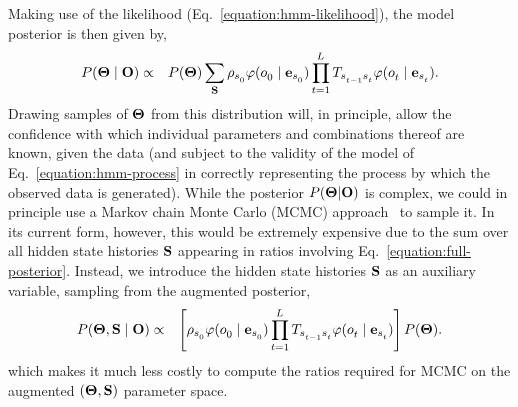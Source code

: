 \documentclass[aps,pre,twocolumn,superscriptaddress,nofootinbib,longbibliography]{revtex4-1}
\newcommand{\bfm}[1]{{\bf #1}}
\begin{document}
{Making use of the likelihood (Eq.~\ref{equation:hmm-likelihood}), the model posterior is then given by,
\begin{eqnarray}
P(\bfm{\Theta} \mid \bfm{O}) &\propto& P(\bfm{\Theta}) \sum_{\bfm{S}}\rho_{s^{}_{0}} \varphi(o^{}_{0} \mid \bfm{e}_{s^{}_{0}}) \prod_{t=1}^{L^{}} T_{s^{}_{t-1} s^{}_{t}} \varphi(o^{}_{t} \mid \bfm{e}_{s^{}_{t}})  \label{equation:full-posterior} .
\end{eqnarray}
Drawing samples of $\bfm{\Theta}$ from this distribution will, in principle, allow the confidence with which individual parameters and combinations thereof are known, given the data (and subject to the validity of the model of Eq.~\ref{equation:hmm-process} in correctly representing the process by which the observed data is generated).
While the posterior $P(\bfm{\Theta}|\bfm{O})$ is complex, we could in principle use a Markov chain Monte Carlo (MCMC) approach~\cite{jun-s-liu:mcmc} to sample it.
In its current form, however, this would be extremely expensive due to the sum over all hidden state histories $\bfm{S}$ appearing in ratios involving Eq.~\ref{equation:full-posterior}.
Instead, we introduce the hidden state histories $\bfm{S}$ as an auxiliary variable, sampling from the augmented posterior,
\begin{eqnarray}
P(\bfm{\Theta}, \bfm{S} \mid \bfm{O}) &\propto& \left[ \rho_{s^{}_{0}} \varphi(o^{}_{0} \mid \bfm{e}_{s^{}_{0}}) \prod_{t=1}^{L^{}} T_{s^{}_{t-1} s^{}_{t}} \varphi(o^{}_{t} \mid \bfm{e}_{s^{}_{t}}) \right] P(\bfm{\Theta}) . \nonumber \\\label{equation:augmented-posterior} 
\end{eqnarray}
which makes it much less costly to compute the ratios required for MCMC on the augmented $(\bfm{\Theta},\bfm{S})$ parameter space.

}
\end{document}
